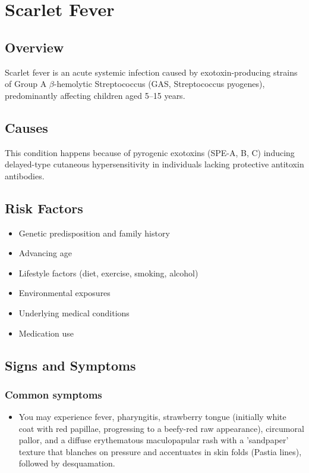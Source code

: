 \chapter{Scarlet Fever}
\label{sec:Scarlet Fever}

\section{Overview}
Scarlet fever is an acute systemic infection caused by exotoxin-producing strains of Group A $\beta$-hemolytic Streptococcus (GAS, Streptococcus pyogenes), predominantly affecting children aged 5--15 years.
\section{Causes}
This condition happens because of pyrogenic exotoxins (SPE-A, B, C) inducing delayed-type cutaneous hypersensitivity in individuals lacking protective antitoxin antibodies.     
\section{Risk Factors}

\begin{itemize}[noitemsep]
  \item Genetic predisposition and family history
  \item Advancing age
  \item Lifestyle factors (diet, exercise, smoking, alcohol)
  \item Environmental exposures
  \item Underlying medical conditions
  \item Medication use
\end{itemize}
\section{Signs and Symptoms}

\subsection{Common symptoms}
\begin{itemize}[noitemsep]
  \item You may experience fever, pharyngitis, strawberry tongue (initially white coat with red papillae, progressing to a beefy-red raw appearance), circumoral pallor, and a diffuse erythematous maculopapular rash with a 'sandpaper' texture that blanches on pressure and accentuates in skin folds (Pastia lines), followed by desquamation. 
  \end{itemize}

